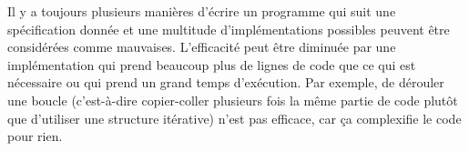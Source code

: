 Il y a toujours plusieurs manières d'écrire un programme qui suit une spécification donnée et une multitude d'implémentations possibles peuvent être considérées comme mauvaises. L'efficacité peut être diminuée par une implémentation qui prend beaucoup plus de lignes de code que ce qui est nécessaire ou qui prend un grand temps d'exécution. Par exemple, de dérouler une boucle (c'est-à-dire copier-coller plusieurs fois la même partie de code plutôt que d'utiliser une structure itérative) n'est pas efficace, car ça complexifie le code pour rien.